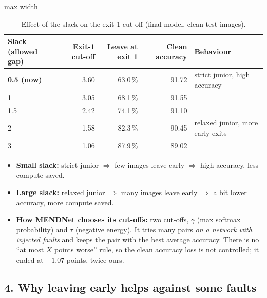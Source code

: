 \documentclass[10pt,a4paper]{article}
\begin{document}
\begin{table}[H]
\centering\small
\caption{Effect of the slack on the exit-1 cut-off (final model, clean test images).}
\label{tab:slackcut}
\begin{adjustbox}{max width=\linewidth}
\begin{tabular}{@{}lrrrl@{}}
\toprule
Slack (allowed gap) & Exit-1 cut-off & Leave at exit 1 & Clean accuracy & Behaviour \\
\midrule
\textbf{0.5 (now)} & 3.60 & 63.0\,\% & 91.72 & strict junior, high accuracy \\
1                  & 3.05 & 68.1\,\% & 91.55 & \\
1.5                & 2.42 & 74.1\,\% & 91.10 & \\
2                  & 1.58 & 82.3\,\% & 90.45 & relaxed junior, more early exits \\
3                  & 1.06 & 87.9\,\% & 89.02 & \\
\bottomrule
\end{tabular}
\end{adjustbox}
\end{table}

\begin{itemize}
  \item \textbf{Small slack:} strict junior $\Rightarrow$ few images leave early $\Rightarrow$ high accuracy, less compute saved.
  \item \textbf{Large slack:} relaxed junior $\Rightarrow$ many images leave early $\Rightarrow$ a bit lower accuracy,
        more compute saved.
  \item \textbf{How MENDNet chooses its cut-offs:} two cut-offs, $\gamma$ (max softmax probability) and $\tau$
        (negative energy). It tries many pairs \emph{on a network with injected faults} and keeps the pair with the
        best average accuracy. There is no ``at most $X$ points worse'' rule, so the clean accuracy loss is not
        controlled; it ended at $-1.07$ points, twice ours.
\end{itemize}

\subsection*{4. Why leaving early helps against some faults}
\end{document}
